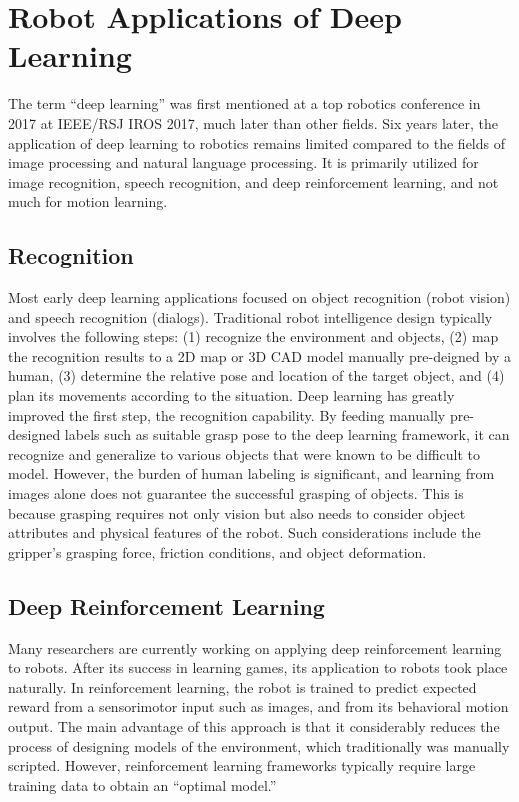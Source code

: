 \documentclass[letterpaper, 10 pt, conference, dvipdfmx]{ieeeconf}  %
\begin{document}
\section{Robot Applications of Deep Learning}
The term ``deep learning'' was first mentioned at a top robotics conference in 2017 at IEEE/RSJ IROS 2017, much later than other fields.
Six years later, the application of deep learning to robotics remains limited compared to the fields of image processing and natural language processing. It is primarily utilized for image recognition, speech recognition, and deep reinforcement learning, and not much for motion learning.

\subsection{Recognition}
Most early deep learning applications focused on object recognition (robot vision) and speech recognition (dialogs). Traditional robot intelligence design typically involves the following steps: (1) recognize the environment and objects, (2) map the recognition results to a 2D map or 3D CAD model manually pre-deigned by a human, (3) determine the relative pose and location of the target object, and (4) plan its movements according to the situation. Deep learning has greatly improved the first step, the recognition capability. By feeding manually pre-designed labels such as suitable grasp pose to the deep learning framework, it can recognize and generalize to various objects that were known to be difficult to model. However, the burden of human labeling is significant, and learning from images alone does not guarantee the successful grasping of objects. This is because grasping requires not only vision but also needs to consider object attributes and physical features of the robot. Such considerations include the gripper's grasping force, friction conditions, and object deformation.

\subsection{Deep Reinforcement Learning}
Many researchers are currently working on applying deep reinforcement learning to robots. After its success in learning games, its application to robots took place naturally. 
In reinforcement learning, the robot is trained to predict expected reward from a sensorimotor input such as images, and from its behavioral motion output. The main advantage of this approach is that it considerably reduces the process of designing models of the environment, which traditionally was manually scripted. However, reinforcement learning frameworks typically require large training data to obtain an ``optimal model.''
\end{document}
